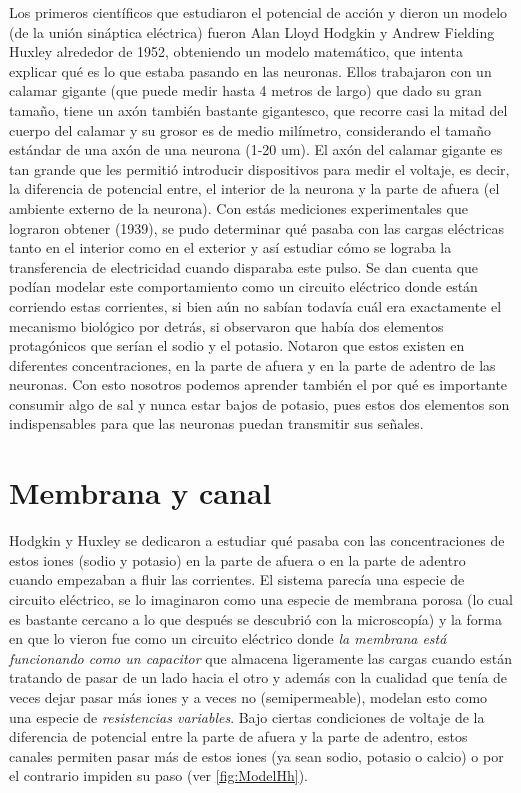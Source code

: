 Los primeros científicos que estudiaron el potencial de acción y dieron un modelo (de la unión sináptica eléctrica) fueron Alan Lloyd Hodgkin y Andrew Fielding Huxley alrededor de 1952, obteniendo un modelo matemático, que intenta explicar qué es lo que estaba pasando en las neuronas. Ellos trabajaron con un calamar gigante (que puede medir hasta 4 metros de largo) que dado su gran tamaño, tiene un axón también bastante gigantesco, que recorre casi la mitad del cuerpo del calamar y su grosor es de medio milímetro, considerando el tamaño estándar de una axón de una neurona (1-20 um). El axón del calamar gigante es tan grande que les permitió introducir dispositivos para medir el voltaje, es decir, la diferencia de potencial entre, el interior de la neurona y la parte de afuera (el ambiente externo de la neurona). Con estás mediciones experimentales que lograron obtener (1939), se pudo determinar qué pasaba con las cargas eléctricas tanto en el interior como en el exterior y así estudiar cómo se lograba la transferencia de electricidad cuando disparaba este pulso. 
 Se dan cuenta que podían modelar este comportamiento como un circuito eléctrico donde están corriendo estas corrientes, si bien aún no sabían todavía cuál era exactamente el mecanismo biológico por detrás, si observaron que había dos elementos protagónicos que serían el sodio y el potasio.
 Notaron que estos existen en diferentes concentraciones, en la parte de afuera y en la parte de adentro de las neuronas. Con esto nosotros podemos aprender también el por qué es importante consumir algo de sal y nunca estar bajos de potasio, pues estos dos elementos son indispensables para que las neuronas puedan transmitir sus señales. 

\section{Membrana y canal}

Hodgkin y Huxley se dedicaron a estudiar qué pasaba con las concentraciones de estos iones (sodio y potasio) en la parte de afuera o en la parte de adentro cuando empezaban a fluir las corrientes. El sistema parecía una especie de circuito eléctrico, se lo imaginaron como una especie de membrana porosa (lo cual es bastante cercano a lo que después se descubrió  con la microscopía) y la forma en que lo vieron fue como un circuito eléctrico donde  \textit{la membrana está funcionando como un capacitor} que almacena ligeramente las cargas cuando están tratando de pasar de un lado hacia el otro y además con la cualidad que tenía de veces dejar pasar más iones y a veces no (semipermeable), modelan esto como una especie de \textit{resistencias variables}. Bajo ciertas condiciones de voltaje de la diferencia de potencial entre la parte de afuera y la parte de adentro, estos canales permiten pasar más de estos iones (ya sean sodio, potasio o calcio) o por el contrario impiden su paso (ver \ref{fig:ModelHh}).


